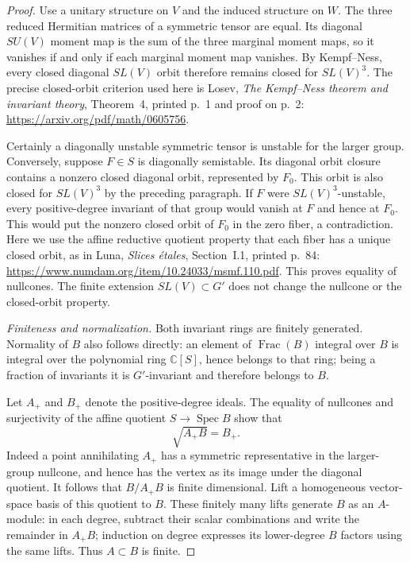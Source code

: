\begin{proof}
Use a unitary structure on $V$ and the induced structure
on $W$.  The three reduced Hermitian matrices of a
symmetric tensor are equal.  Its diagonal $SU(V)$ moment
map is the sum of the three marginal moment maps, so
it vanishes if and only if each marginal moment map
vanishes.  By Kempf--Ness, every closed diagonal
$SL(V)$ orbit therefore remains closed for $SL(V)^3$.
The precise closed-orbit criterion used here is Losev,
\emph{The Kempf--Ness theorem and invariant theory},
Theorem~4, printed p.~1 and proof on p.~2:
\url{https://arxiv.org/pdf/math/0605756}.

Certainly a diagonally unstable symmetric tensor is
unstable for the larger group.  Conversely, suppose
$F\in S$ is diagonally semistable.  Its diagonal orbit
closure contains a nonzero closed diagonal orbit,
represented by $F_0$.  This orbit is also closed for
$SL(V)^3$ by the preceding paragraph.  If $F$ were
$SL(V)^3$-unstable, every positive-degree invariant of
that group would vanish at $F$ and hence at $F_0$.
This would put the nonzero closed orbit of $F_0$ in
the zero fiber, a contradiction.  Here we use the
affine reductive quotient property that each fiber
has a unique closed orbit, as in Luna, \emph{Slices
\'etales}, Section~I.1, printed p.~84:
\url{https://www.numdam.org/item/10.24033/msmf.110.pdf}.
This proves equality of nullcones.  The finite extension
$SL(V)\subset G'$ does not change the nullcone or the
closed-orbit property.

\emph{Finiteness and normalization.}
Both invariant rings are finitely generated.  Normality
of $B$ also follows directly: an element of
$\operatorname{Frac}(B)$ integral over $B$ is integral
over the polynomial ring $\mathbb C[S]$, hence belongs
to that ring; being a fraction of invariants it is
$G'$-invariant and therefore belongs to $B$.

Let $A_+$ and $B_+$ denote the positive-degree ideals.
The equality of nullcones and surjectivity of the affine
quotient $S\to\operatorname{Spec}B$ show that
\[
                       \sqrt{A_+B}=B_+.                       \tag{P-F71f}
\]
Indeed a point annihilating $A_+$ has a symmetric
representative in the larger-group nullcone, and hence
has the vertex as its image under the diagonal quotient.
It follows that $B/A_+B$ is finite dimensional.  Lift a
homogeneous vector-space basis of this quotient to $B$.
These finitely many lifts generate $B$ as an $A$-module:
in each degree, subtract their scalar combinations and
write the remainder in $A_+B$; induction on degree
expresses its lower-degree $B$ factors using the same
lifts.  Thus $A\subset B$ is finite.


\end{proof}
